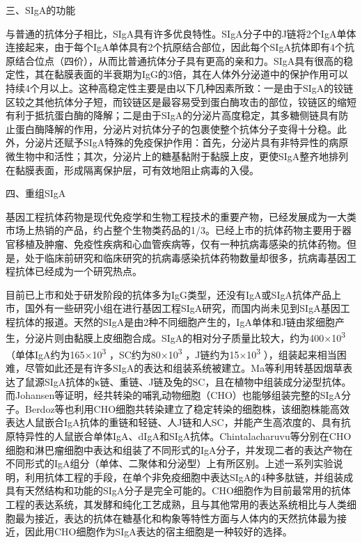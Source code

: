 \begin{center}
{\large 三、SIgA的功能}
\end{center}
与普通的抗体分子相比，SIgA具有许多优良特性。SIgA分子中的J链将2个IgA单体连接起来，由于每个IgA单体具有2个抗原结合部位，因此每个SIgA抗体即有4个抗原结合位点（四价），从而比普通抗体分子具有更高的亲和力。SIgA具有很高的稳定性，其在黏膜表面的半衰期为IgG的3倍，其在人体外分泌道中的保护作用可以持续4个月以上。这种高稳定性主要是由以下几种因素所致：一是由于SIgA的铰链区较之其他抗体分子短，而铰链区是最容易受到蛋白酶攻击的部位，铰链区的缩短有利于抵抗蛋白酶的降解；二是由于SIgA的分泌片高度稳定，其多糖侧链具有防止蛋白酶降解的作用，分泌片对抗体分子的包裹使整个抗体分子变得十分稳。此外，分泌片还赋予SIgA特殊的免疫保护作用：首先，分泌片具有非特异性的病原微生物中和活性；其次，分泌片上的糖基黏附于黏膜上皮，更使SIgA整齐地排列在黏膜表面，形成隔离保护层，可有效地阻止病毒的入侵。

\begin{center}
{\large 四、重组SIgA}
\end{center}
基因工程抗体药物是现代免疫学和生物工程技术的重要产物，已经发展成为一大类市场上热销的产品，约占整个生物类药品的1/3。已经上市的抗体药物主要用于器官移植及肿瘤、免疫性疾病和心血管疾病等，仅有一种抗病毒感染的抗体药物。但是，处于临床前研究和临床研究的抗病毒感染抗体药物数量却很多，抗病毒基因工程抗体已经成为一个研究热点。

目前已上市和处于研发阶段的抗体多为IgG类型，还没有IgA或SIgA抗体产品上市，国外有一些研究小组在进行基因工程SIgA研究，而国内尚未见到SIgA基因工程抗体的报道。天然的SIgA是由2种不同细胞产生的，IgA单体和J链由浆细胞产生，分泌片则由黏膜上皮细胞合成。SIgA的相对分子质量比较大，约为400×10\textsuperscript{3}
（单体IgA约为165×10\textsuperscript{3} ，SC约为80×10\textsuperscript{3}
，J链约为15×10\textsuperscript{3}
），组装起来相当困难，尽管如此还是有许多SIgA的表达和组装系统被建立。Ma等利用转基因烟草表达了鼠源SIgA抗体的κ链、重链、J链及兔的SC，且在植物中组装成分泌型抗体。而Johansen等证明，经共转染的哺乳动物细胞（CHO）也能够组装完整的SIgA分子。Berdoz等也利用CHO细胞共转染建立了稳定转染的细胞株，该细胞株能高效表达人鼠嵌合IgA抗体的重链和轻链、人J链和人SC，并能产生高浓度的、具有抗原特异性的人鼠嵌合单体IgA、dIgA和SIgA抗体。Chintalacharuvu等分别在CHO细胞和淋巴瘤细胞中表达和组装了不同形式的IgA分子，并发现二者的表达产物在不同形式的IgA组分（单体、二聚体和分泌型）上有所区别。上述一系列实验说明，利用抗体工程的手段，在单个非免疫细胞中表达SIgA的4种多肽链，并组装成具有天然结构和功能的SIgA分子是完全可能的。CHO细胞作为目前最常用的抗体工程的表达系统，其发酵和纯化工艺成熟，且与其他常用的表达系统相比与人类细胞最为接近，表达的抗体在糖基化和构象等特性方面与人体内的天然抗体最为接近，因此用CHO细胞作为SIgA表达的宿主细胞是一种较好的选择。

